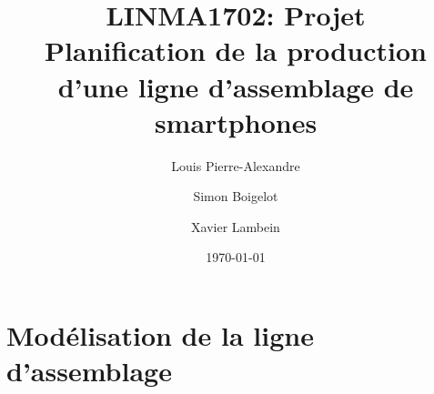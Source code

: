 \documentclass[a4paper,12pt]{article}
\title{LINMA1702: Projet \\ Planification de la production d'une ligne
d'assemblage de smartphones}
\author{Louis Pierre-Alexandre \and Simon Boigelot \and Xavier Lambein}
\date{\today}
\begin{document}
\maketitle

\tableofcontents

\newpage

\section{Modélisation de la ligne d'assemblage}


\end{document}
